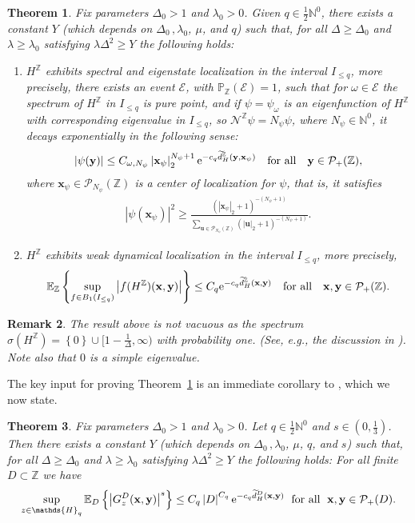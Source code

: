 \documentclass[12pt, a4paper,reqno]{amsart}
\numberwithin{equation}{section}
\newtheorem{theorem}{Theorem}[section]
\newtheorem{remark}[theorem]{Remark}
\newcommand\N{\mathbb N}
\newcommand\Z{\mathbb Z}
\newcommand\x{\mathbf{x}}
\newcommand\y{\mathbf{y}}
\renewcommand\u{\mathbf{u}}
\newcommand\e{\mathrm{e}}
\renewcommand\P{\mathbb P}
\newcommand\E{\mathbb E}
\newcommand\cE{\mathcal{E}}
\newcommand\cN{\mathcal{N}}
\newcommand\cP{\mathcal{P}}
\newcommand\wtilde{\widetilde}
\newcommand\be{\begin{equation}\begin{aligned}}
\newcommand\ee{\end{aligned}\end{equation}}
\newcommand{\abs}[1]{\left\lvert #1 \right\rvert}
\newcommand{\set}[1]{\left\{ #1 \right\}}
\newcommand{\pa}[1]{\left( #1 \right)}
\newcommand{\qtx}[1]{\quad\text{#1}\quad}
\newcommand{\mqtx}[1]{\; \ \text{#1}\; \  }
\begin{document}
  \begin{theorem}\label{thm:ppspec1} 
Fix parameters $\Delta_0>1$ and $ \lambda_0 >0$. Given  $q\in \frac 12 \N^0$, 
 there exists a constant $Y$ (which depends on $\Delta_0\,,\lambda_0$, $\mu$, and $q$) such that, 
 for all $\Delta \ge \Delta_0$ and $\lambda\ge \lambda_0$ satisfying  $\lambda \Delta^2\ge Y$ the following holds:  

\begin{enumerate}


\item  $H^\Z$ exhibits spectral and eigenstate  localization  in the interval  $I_{\le q}$, more precisely, there exists an event $\cE$, with $\P_\Z(\cE)=1$, such that for $\omega \in \cE$  the spectrum of $H^\Z$ in $I_{\le q}$ is pure point, and if $\psi=\psi_\omega$ is an eigenfunction of $H^\Z$ with corresponding eigenvalue  in  $I_{{\le q}}$, so $\cN^\Z\psi =N_\psi \psi$, where   $ N_\psi \in \N^0$,  it decays exponentially   in the following sense:   
\be
\abs{\psi(\y)} \le C_{\omega,N_\psi}   \abs{\x_{\psi}}_2^{N_\psi +1}\e^{-{c_q} \wtilde d_{H}^\Z({\bf y},\x_{\psi})} \qtx{for all} \y \in \cP_+(\Z), 
\ee
where $\x_{\psi}\in \cP_{N_\psi}(\Z)$ is a center of localization for $\psi$,  that is, it satisfies
\be
\abs{\psi(\x_{\psi})}^2 \ge
  \frac {\pa{\abs{\x_{\psi}}_2+1}^{-\pa{N_\psi+1}}}{\sum_{\u \in  \cP_{N_\psi}(\Z)}       \pa{    \abs{\u}_2+1}^{-\pa{N_\psi +1}}} .
\ee


\item $H^\Z$ exhibits weak dynamical localization in the interval  $I_{{ \le q}}$, more precisely,
\be\label{eq:dloc}
\E_\Z \set{\sup_{f\in B_1(I_{\le q})}\abs{ f(H^\Z) (\x,\y)}}\le  C_q \e^{-c_q \wtilde d_{H}^\Z({\bf x},{\bf y})} \qtx{for all}\x,\y\in \cP_{+}(\Z).
\ee
\end{enumerate}
\end{theorem}


\begin{remark}
 The result above is not vacuous as  the spectrum $\sigma(H^\Z)=\set{0}\cup[1-\frac1\Delta,\infty)$ with probability one.  (See, e.g., the discussion in  \cite{EKS1}).  Note also that $0$ is a simple eigenvalue.
 \end{remark}





The key input for proving Theorem~\ref{thm:ppspec1} is an immediate corollary to \cite[Theorem 2.4]{EK22}, which we now state.

\begin{theorem}\label{thminput}
Fix parameters $\Delta_0>1$ and $ \lambda_0 >0$. Let $q\in \frac 12 \N^0$ and $s \in (0,\frac 13)$.
  Then there exists a constant $Y$ (which depends on $\Delta_0\,,\lambda_0$, $\mu$, $q$, and $s$) such that, 
 for all $\Delta \ge \Delta_0$ and $\lambda\ge \lambda_0$ satisfying  $\lambda \Delta^2\ge Y$ the following holds:  
For  all finite $D\subset \Z$  we have
 \be\label{eq:FVC56}
\sup_{z\in\mathds{H}_q} \E_D\set{\abs{G^{D}_{z}({\bf x},{\bf y})}^s}\le C_q \abs{D}^{C_q}\e^{-c_q  \wtilde d^D_H ({\bf x},{\bf y})} \mqtx{for all} {\bf x},{\bf y} \in \cP_+(D).
\ee
\end{theorem}
\end{document}
